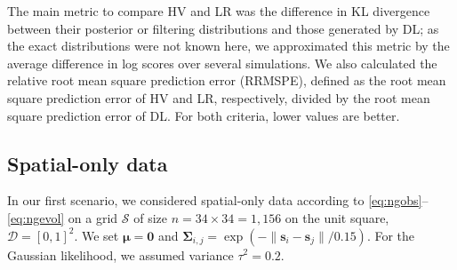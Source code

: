 \documentclass[12pt,letterpaper]{article}
\theoremstyle{propstyle}
\theoremstyle{propstyle}
\theoremstyle{propstyle}
\theoremstyle{propstyle}
\theoremstyle{propstyle}
\newcommand{\bs}{\mathbf{s}}
\newcommand{\bfzero}{\mathbf{0}}
\newcommand{\bfmu}{\bm{\mu}}
\newcommand{\bfSigma}{\bm{\Sigma}}
\newcommand{\sx}{\mathcal{X}}
\newcommand{\domain}{\mathcal{D}}
\newcommand{\jm}{{j_1,\ldots,j_m}}
\newcommand{\jM}{{j_1,\ldots,j_M}}
\newcommand{\grid}{\mathcal{S}}
\begin{document}
The main metric to compare HV and LR was the difference in KL divergence between their posterior or filtering distributions and those generated by DL; as the exact distributions were not known here, we approximated this metric by the average difference in log scores \citep[dLS; e.g.,][]{Gneiting2014} over several simulations. We also calculated the relative root mean square prediction error (RRMSPE), defined as the root mean square prediction error of HV and LR, respectively, divided by the root mean square prediction error of DL. For both criteria, lower values are better.



\subsection{Spatial-only data}
\label{sec:purely-spatial}

In our first scenario, we considered spatial-only data according to \eqref{eq:ngobs}--\eqref{eq:ngevol} on a grid $\grid$ of size $n=34 \times 34 = 1{,}156$ on the unit square, $\domain = [0,1]^2$. We set $\bfmu = \bfzero$ and $\bfSigma_{i,j} = \exp(-\|\bs_i - \bs_j\|/0.15)$. For the Gaussian likelihood, we assumed variance $\tau^2 = 0.2$. %

\end{document}
